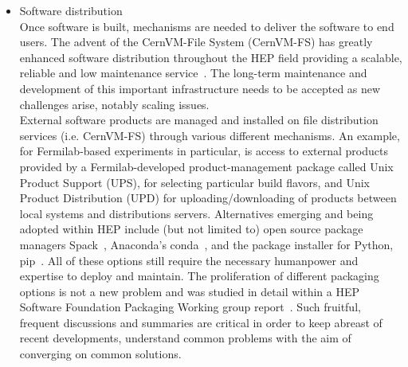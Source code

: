 \begin{itemize}
  \item Software distribution\\
Once software is built, mechanisms are needed to deliver the software to end users. The advent of the CernVM-File System (CernVM-FS) has greatly enhanced software distribution throughout the HEP field providing a scalable, reliable and low maintenance service~\cite{stewart_graeme_andrew_2020_4009114,Blomer:2011zz,7310920}. The long-term maintenance and development of this important infrastructure needs to be accepted as new challenges arise, notably scaling issues. \\
External software products are managed and installed on file distribution services (i.e. CernVM-FS) through various different mechanisms. An example, for Fermilab-based experiments in particular, is access to external
products provided by a Fermilab-developed product-management package called Unix Product
Support (UPS), for selecting particular build flavors, and Unix Product Distribution (UPD) for uploading/downloading of products between local systems and distributions servers. Alternatives emerging and being adopted within HEP include (but not limited to) open source package managers Spack~\cite{7832814}, Anaconda's conda~\cite{anaconda}, and the package installer for Python, pip~\cite{pypi}. All of these options still require the necessary humanpower and expertise to deploy and maintain. 
The proliferation of different packaging options is not a new problem and was studied in detail within a HEP Software Foundation Packaging Working group report~\cite{l_sexton_kennedy_2016_1472340}. Such fruitful, frequent discussions and summaries are critical in order to keep abreast of recent developments, understand common problems with the aim of converging on common solutions. 


\end{itemize}
